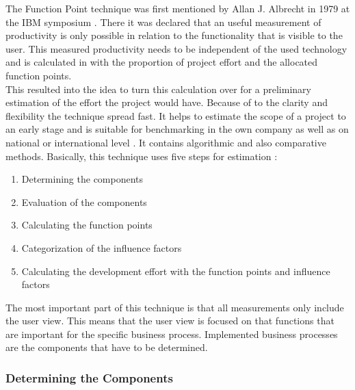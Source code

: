 The Function Point technique was first mentioned by Allan J. Albrecht in 1979 at the IBM symposium \cite{albrecht}. There it was declared that an useful measurement of productivity is only possible in relation to the functionality that is visible to the user. This measured productivity needs to be independent of the used technology and is calculated in with the proportion of project effort and the allocated function points.\\
This resulted into the idea to turn this calculation over for a preliminary estimation of the effort the project would have. Because of to the clarity and flexibility the technique spread fast. It helps to estimate the scope of a project to an early stage and is suitable for benchmarking in the own company as well as on national or international level \cite{FPKompakt}. It contains algorithmic and also comparative methods. Basically, this technique uses five steps for estimation \cite{jenny}:
\begin{enumerate}
	\item Determining the components
	\item Evaluation of the components
	\item Calculating the function points
	\item Categorization of the influence factors
	\item Calculating the development effort with the function points and influence factors
\end{enumerate}
The most important part of this technique is that all measurements only include the user view. This means that the user view is focused on that functions that are important for the specific business process. Implemented business processes are the components that have to be determined.

\subsubsection{Determining the Components}

